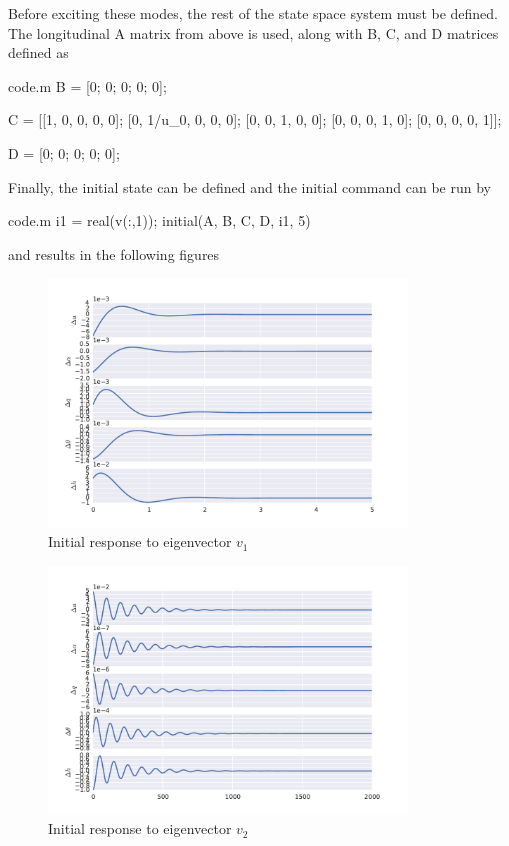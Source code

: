 \documentclass[12pt]{article}
\begin{document}
\noindent Before exciting these modes, the rest of the state space system must be defined. The longitudinal A matrix from above is used, along with B, C, and D matrices defined as
\begin{filecontents*}{code.m}
B = [0; 0; 0; 0; 0];

C = [[1, 0, 0, 0, 0];
     [0, 1/u_0, 0, 0, 0];
     [0, 0, 1, 0, 0];
     [0, 0, 0, 1, 0];
     [0, 0, 0, 0, 1]];

D = [0; 0; 0; 0; 0];
\end{filecontents*}


\noindent Finally, the initial state can be defined and the initial command can be run by
\begin{filecontents*}{code.m}
i1 = real(v(:,1));
initial(A, B, C, D, i1, 5)
\end{filecontents*}


\noindent and results in the following figures
\begin{figure}[h]
\begin{center}
\includegraphics[width=0.85\textwidth]{figures/LongI2.pdf}
\caption{Initial response to eigenvector $v_1$}
\label{}
\end{center}
\end{figure}

\begin{figure}[h]
\begin{center}
\includegraphics[width=0.85\textwidth]{figures/LongI4.pdf}
\caption{Initial response to eigenvector $v_2$}
\label{}
\end{center}
\end{figure}
\end{document}
